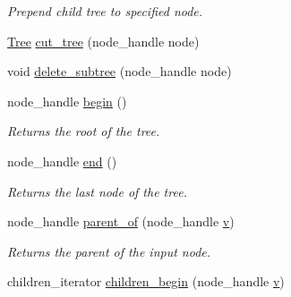 \begin{DoxyCompactItemize}
\begin{DoxyCompactList}\small\item\em Prepend child tree to specified node. \end{DoxyCompactList}\item 
\hyperlink{class_d_o_1_1_tree}{Tree} \hyperlink{class_d_o_1_1_tree_aba6ece339051b6bad21840d986bd0a3a}{cut\-\_\-tree} (node\-\_\-handle node)
\item 
void \hyperlink{class_d_o_1_1_tree_a73a3166a18f4d9091d128d7ede38d740}{delete\-\_\-subtree} (node\-\_\-handle node)
\item 
\hypertarget{class_d_o_1_1_tree_acebef34190c5b61c05d2c5e9308c00a4}{node\-\_\-handle \hyperlink{class_d_o_1_1_tree_acebef34190c5b61c05d2c5e9308c00a4}{begin} ()}\label{class_d_o_1_1_tree_acebef34190c5b61c05d2c5e9308c00a4}

\begin{DoxyCompactList}\small\item\em Returns the root of the tree. \end{DoxyCompactList}\item 
\hypertarget{class_d_o_1_1_tree_a84c3a10b394fa5d0687d032a086c3e96}{node\-\_\-handle \hyperlink{class_d_o_1_1_tree_a84c3a10b394fa5d0687d032a086c3e96}{end} ()}\label{class_d_o_1_1_tree_a84c3a10b394fa5d0687d032a086c3e96}

\begin{DoxyCompactList}\small\item\em Returns the last node of the tree. \end{DoxyCompactList}\item 
\hypertarget{class_d_o_1_1_tree_a50e15fc2193067f33398e37e01d8a2ae}{node\-\_\-handle \hyperlink{class_d_o_1_1_tree_a50e15fc2193067f33398e37e01d8a2ae}{parent\-\_\-of} (node\-\_\-handle \hyperlink{group___channel_accessors_ga1dd2524c5b8d3db33137eedb803fc2ce}{v})}\label{class_d_o_1_1_tree_a50e15fc2193067f33398e37e01d8a2ae}

\begin{DoxyCompactList}\small\item\em Returns the parent of the input node. \end{DoxyCompactList}\item 
\hypertarget{class_d_o_1_1_tree_ae25e673000362d17c5dbe34e13ed26a9}{children\-\_\-iterator \hyperlink{class_d_o_1_1_tree_ae25e673000362d17c5dbe34e13ed26a9}{children\-\_\-begin} (node\-\_\-handle \hyperlink{group___channel_accessors_ga1dd2524c5b8d3db33137eedb803fc2ce}{v})}\label{class_d_o_1_1_tree_ae25e673000362d17c5dbe34e13ed26a9}


\end{DoxyCompactItemize}
